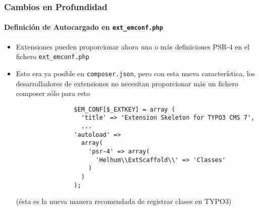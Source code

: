 \begin{frame}[fragile]
	\frametitle{Cambios en Profundidad}
	\framesubtitle{Definición de Autocargado en \texttt{ext\_emconf.php}}

	\lstset{basicstyle=\tiny\ttfamily}

	\begin{itemize}

		\item Extensiones pueden proporcionar ahora una o más definiciones PSR-4 en el fichero \texttt{ext\_emconf.php}

		\item Esto era ya posible en \texttt{composer.json}, pero con esta nueva característica,
			los desarrolladores de extensiones no necesitan proporcionar más un fichero composer sólo para esto

			\begin{lstlisting}
				$EM_CONF[$_EXTKEY] = array (
				  'title' => 'Extension Skeleton for TYPO3 CMS 7',
				  ...
				'autoload' =>
				  array(
				    'psr-4' => array(
				      'Helhum\\ExtScaffold\\' => 'Classes'
				    )
				  )
				);
			\end{lstlisting}

			\small
				(ésta es la nueva manera recomendada de registrar clases en TYPO3)
			\normalsize

	\end{itemize}

\end{frame}



